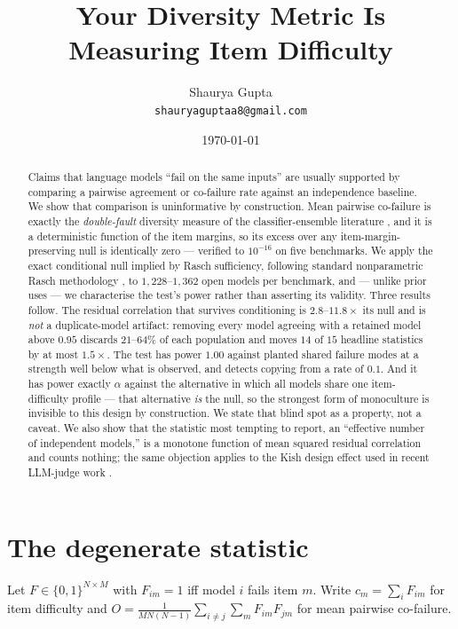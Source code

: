 \documentclass[10pt,letterpaper]{article}
\title{\bfseries Your Diversity Metric Is Measuring Item Difficulty}
\author{Shaurya Gupta\\\small\texttt{shauryaguptaa8@gmail.com}}
\date{\today}
\begin{document}
\maketitle

\begin{abstract}
\noindent
Claims that language models ``fail on the same inputs'' are usually supported by comparing a
pairwise agreement or co-failure rate against an independence baseline. We show that comparison is
uninformative by construction. Mean pairwise co-failure is exactly the \emph{double-fault}
diversity measure of the classifier-ensemble literature \citep{kuncheva2003}, and it is a
deterministic function of the item margins, so its excess over any item-margin-preserving null is
identically zero --- verified to $10^{-16}$ on five benchmarks. We apply the exact conditional
null implied by Rasch sufficiency, following standard nonparametric Rasch methodology
\citep{ponocny2001}, to $1{,}228$--$1{,}362$ open models per benchmark, and --- unlike prior uses
--- we characterise the test's power rather than asserting its validity. Three results follow.
The residual correlation that survives conditioning is $2.8$--$11.8\times$ its null and is
\emph{not} a duplicate-model artifact: removing every model agreeing with a retained model above
$0.95$ discards $21$--$64\%$ of each population and moves $14$ of $15$ headline statistics by at
most $1.5\times$. The test has power $1.00$ against planted shared failure modes at a strength well
below what is observed, and detects copying from a rate of $0.1$. And it has power exactly
$\alpha$ against the alternative in which all models share one item-difficulty profile --- that
alternative \emph{is} the null, so the strongest form of monoculture is invisible to this design
by construction. We state that blind spot as a property, not a caveat. We also show that the
statistic most tempting to report, an ``effective number of independent models,'' is a monotone
function of mean squared residual correlation and counts nothing; the same objection applies to
the Kish design effect used in recent LLM-judge work \citep{kohli2026nine}.
\end{abstract}

\section{The degenerate statistic}

Let $F\in\{0,1\}^{N\times M}$ with $F_{im}=1$ iff model $i$ fails item $m$. Write $c_m=\sum_i F_{im}$
for item difficulty and $O=\frac{1}{MN(N-1)}\sum_{i\neq j}\sum_m F_{im}F_{jm}$ for mean pairwise
co-failure.
\end{document}
